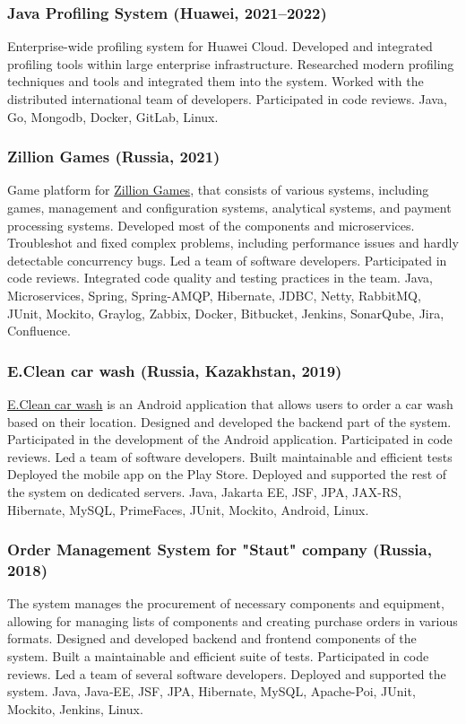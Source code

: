 \documentclass{vl}
\begin{document}
    \subsubsection*{Java Profiling System (Huawei, 2021--2022)}
    Enterprise-wide profiling system for Huawei Cloud.
    Developed and integrated profiling tools within large enterprise infrastructure.
    Researched modern profiling techniques and tools and integrated them into the system.
    Worked with the distributed international team of developers.
    Participated in code reviews.
    Java, Go, Mongodb, Docker, GitLab, Linux.

    \subsubsection*{Zillion Games (Russia, 2021)}
    Game platform for \href{http://zillion.games/}{Zillion Games}, that consists of various systems, including games,
    management and configuration systems, analytical systems, and payment processing systems.
    Developed most of the components and microservices.
    Troubleshot and fixed complex problems, including performance issues and hardly detectable concurrency bugs.
    Led a team of software developers.
    Participated in code reviews.
    Integrated code quality and testing practices in the team.
    Java, Microservices, Spring, Spring-AMQP, Hibernate, JDBC, Netty, RabbitMQ, JUnit, Mockito, Graylog, Zabbix, Docker,
    Bitbucket, Jenkins, SonarQube, Jira, Confluence.

    \subsubsection*{E.Clean car wash (Russia, Kazakhstan, 2019)}
    \href{https://play.google.com/store/apps/details?id=com.altinntech.eclean}{E.Clean car wash} is an Android application
    that allows users to order a car wash based on their location.
    Designed and developed the backend part of the system.
    Participated in the development of the Android application.
    Participated in code reviews.
    Led a team of software developers.
    Built maintainable and efficient tests
    Deployed the mobile app on the Play Store.
    Deployed and supported the rest of the system on dedicated servers.
    Java, Jakarta EE, JSF, JPA, JAX-RS, Hibernate, MySQL, PrimeFaces, JUnit, Mockito, Android, Linux.

    \subsubsection*{Order Management System for "Staut" company (Russia, 2018)}
    The system manages the procurement of necessary components and equipment,
    allowing for managing lists of components and creating purchase orders in various formats.
    Designed and developed backend and frontend components of the system.
    Built a maintainable and efficient suite of tests.
    Participated in code reviews.
    Led a team of several software developers.
    Deployed and supported the system.
    Java, Java‐EE, JSF, JPA, Hibernate, MySQL, Apache-Poi, JUnit, Mockito, Jenkins, Linux.
\end{document}
